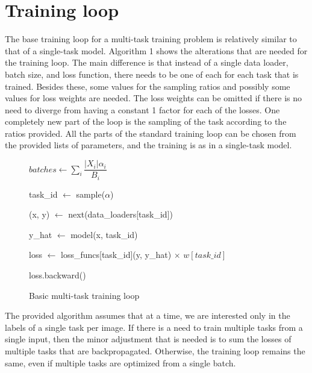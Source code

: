 \section{Training loop}


The base training loop for a multi-task training problem is relatively similar to that of a single-task model.
Algorithm 1 shows the alterations that are needed for the training loop.
The main difference is that instead of a single data loader, batch size, and loss function, there needs to be one of each for each task that is trained.
Besides these, some values for the sampling ratios and possibly some values for loss weights are needed.
The loss weights can be omitted if there is no need to diverge from having a constant 1 factor for each of the losses.
One completely new part of the loop is the sampling of the task according to the ratios provided.
All the parts of the standard training loop can be chosen from the provided lists of parameters, and the training is as in a single-task model.

\begin{figure}[ht]
    \centering
    \begin{minipage}{.95\linewidth}
        \begin{algorithm}[H]
            \caption{Basic multi-task training loop}
            $batches \leftarrow \sum_i{ \dfrac{|X_i| \alpha_i}{B_i}}$

             {
                {

                    {task\_id $\leftarrow$ sample($\alpha$)}

                        {(x, y) $\leftarrow$ next(data\_loaders[task\_id])}

                        {y\_hat $\leftarrow$ {model(x, task\_id)}}

                        {loss $\leftarrow$ loss\_funcs[task\_id](y, y\_hat) $\times$ $w[task\_id]$}

                        {loss.backward()}
                }
            }
        \end{algorithm}
    \end{minipage}
\end{figure}


The provided algorithm assumes that at a time, we are interested only in the labels of a single task per image.
If there is a need to train multiple tasks from a single input, then the minor adjustment that is needed is to sum the losses of multiple tasks that are backpropagated.
Otherwise, the training loop remains the same, even if multiple tasks are optimized from a single batch.


